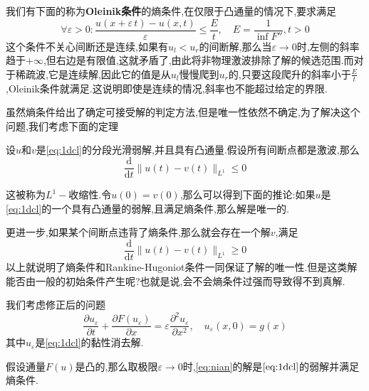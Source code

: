 我们有下面的称为\textbf{Oleinik条件}的熵条件,在仅限于凸通量的情况下,要求满足
$$
\forall \varepsilon>0:\frac{u(x+\varepsilon\,t)-u(x,t)}{\varepsilon}\leqslant \frac{E}{t},\quad E=\frac{1}{\inf F''},t>0
$$
这个条件不关心间断还是连续,如果有$u_l<u_r$的间断解,那么当$\varepsilon\to 0$时,左侧的斜率趋于$+\infty$,但右边是有限值,这就矛盾了,由此将非物理激波排除了解的候选范围.而对于稀疏波,它是连续解,因此它的值是从$u_l$慢慢爬到$u_r$的,只要这段爬升的斜率小于$\frac{E}{t}$,Oleinik条件就满足.这说明即使是连续的情况,斜率也不能超过给定的界限.\par
虽然熵条件给出了确定可接受解的判定方法,但是唯一性依然不确定,为了解决这个问题,我们考虑下面的定理
\begin{Theorem}{}
    设$u$和$v$是\eqref{eq:1dcl}的分段光滑弱解,并且具有凸通量.假设所有间断点都是激波,那么
    $$
    \frac{\mathrm{d}}{\mathrm{d}t}\|u(t)-v(t)\|_{L^1}\leqslant 0
    $$
\end{Theorem}
这被称为$L^1-$收缩性.令$u(0)=v(0)$,那么可以得到下面的推论:如果$u$是\eqref{eq:1dcl}的一个具有凸通量的弱解,且满足熵条件,那么解是唯一的.\par
更进一步,如果某个间断点违背了熵条件,那么就会存在一个解$v$,满足
$$
\frac{\mathrm{d}}{\mathrm{d}t}\|u(t)-v(t)\|_{L^1}\geqslant 0
$$
\qquad 以上就说明了熵条件和Rankine-Hugoniot条件一同保证了解的唯一性.但是这类解能否由一般的初始条件产生呢?也就是说,会不会熵条件过强而导致得不到真解.\par
我们考虑修正后的问题
\begin{equation}
    \frac{\partial u_{\varepsilon}}{\partial t}+\frac{\partial F(u_{\varepsilon})}{\partial x}=\varepsilon\frac{\partial^2 u_{\varepsilon}}{\partial x^2},\quad u_{\varepsilon}(x,0)=g(x)
    \label{eq:nian}
\end{equation}
其中$u_{\varepsilon}$是\eqref{eq:1dcl}的黏性消去解.
\begin{Theorem}{}
    假设通量$F(u)$是凸的,那么取极限$\varepsilon\to 0$时,\eqref{eq:nian}的解是$\eqref{eq:1dcl}$的弱解并满足熵条件.
\end{Theorem}








































